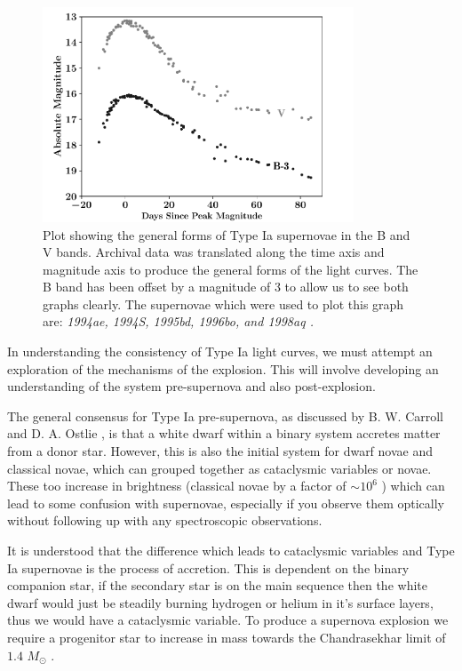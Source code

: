 \documentclass[twocolumn]{revtex4}
\newcommand{\squeezeup}{\vspace{-2.5mm}}
\begin{document}
\squeezeup
\begin{figure}[!h]
\begin{center}
\includegraphics[width=9.25cm]{intro/typeia}
\caption[]{Plot showing the general forms of Type Ia supernovae in the B and V bands. Archival data was translated along the time axis and magnitude axis to produce the general forms of the light curves. The B band has been offset by a magnitude of $3$ to allow us to see both graphs clearly. The supernovae which were used to plot this graph are: \em{1994ae, 1994S, 1995bd, 1996bo, }\em  and \em{1998aq }\em \cite{jha, matheson}. }
\label{typeia-standard}
\end{center}
\end{figure}
\squeezeup
\squeezeup

In understanding the consistency of Type Ia light curves, we must attempt an exploration of the mechanisms of the explosion. This will involve developing an understanding of the system pre-supernova and also post-explosion.

The general consensus for Type Ia pre-supernova, as discussed by B. W. Carroll and D. A. Ostlie \cite{mod_ast}, is that a white dwarf within a binary system accretes matter from a donor star. However, this is also the initial system for dwarf novae and classical novae, which can grouped together as cataclysmic variables or novae. These too increase in brightness (classical novae by a factor of $\sim 10^6$ \cite{mod_ast}) which can lead to some confusion with supernovae, especially if you observe them optically without following up with any spectroscopic observations. 

It is understood that the difference which leads to cataclysmic variables and Type Ia supernovae is the process of accretion. This is dependent on the binary companion star, if the secondary star is on the main sequence then the white dwarf would just be steadily burning hydrogen or helium in it's surface layers, thus we would have a cataclysmic variable. To produce a supernova explosion we require a progenitor star to increase in mass towards the Chandrasekhar limit of $1.4$ $M_{\odot}$ \cite{posn, longair}. 
\end{document}
